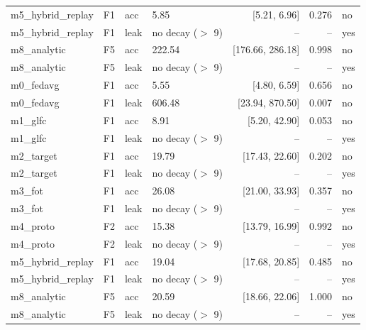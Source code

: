 \begin{tabular}{llllrrl}
m5\_hybrid\_replay & F1 & acc & 5.85 & [5.21, 6.96] & 0.276 & no \\
m5\_hybrid\_replay & F1 & leak & no decay ($>$ 9) & -- & -- & yes \\
m8\_analytic & F5 & acc & 222.54 & [176.66, 286.18] & 0.998 & no \\
m8\_analytic & F5 & leak & no decay ($>$ 9) & -- & -- & yes \\
m0\_fedavg & F1 & acc & 5.55 & [4.80, 6.59] & 0.656 & no \\
m0\_fedavg & F1 & leak & 606.48 & [23.94, 870.50] & 0.007 & no \\
m1\_glfc & F1 & acc & 8.91 & [5.20, 42.90] & 0.053 & no \\
m1\_glfc & F1 & leak & no decay ($>$ 9) & -- & -- & yes \\
m2\_target & F1 & acc & 19.79 & [17.43, 22.60] & 0.202 & no \\
m2\_target & F1 & leak & no decay ($>$ 9) & -- & -- & yes \\
m3\_fot & F1 & acc & 26.08 & [21.00, 33.93] & 0.357 & no \\
m3\_fot & F1 & leak & no decay ($>$ 9) & -- & -- & yes \\
m4\_proto & F2 & acc & 15.38 & [13.79, 16.99] & 0.992 & no \\
m4\_proto & F2 & leak & no decay ($>$ 9) & -- & -- & yes \\
m5\_hybrid\_replay & F1 & acc & 19.04 & [17.68, 20.85] & 0.485 & no \\
m5\_hybrid\_replay & F1 & leak & no decay ($>$ 9) & -- & -- & yes \\
m8\_analytic & F5 & acc & 20.59 & [18.66, 22.06] & 1.000 & no \\
m8\_analytic & F5 & leak & no decay ($>$ 9) & -- & -- & yes \\
\bottomrule
\end{tabular}
